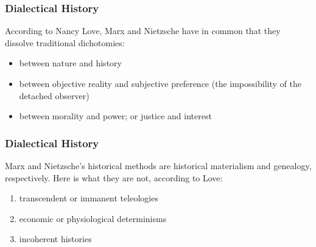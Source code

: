 \documentclass[xcolor=dvipsnames]{beamer}
\begin{document}

\begin{frame}
  \frametitle{Dialectical History}
  According to Nancy Love, Marx and Nietzsche have in common that they
  dissolve traditional dichotomies:
  \begin{itemize}
  \item between nature and history
  \item between objective reality and subjective preference (the
    impossibility of the detached observer)
  \item between morality and power; or justice and interest
  \end{itemize}
\end{frame}

\begin{frame}
  \frametitle{Dialectical History}
  Marx and Nietzsche's historical methods are \alert{historical
    materialism} and \alert{genealogy}, respectively. Here is what
  they are not, according to Love:
  \begin{enumerate}
  \item transcendent or immanent teleologies
  \item economic or physiological determinisms
  \item incoherent histories
  \end{enumerate}
\end{frame}
\end{document}
